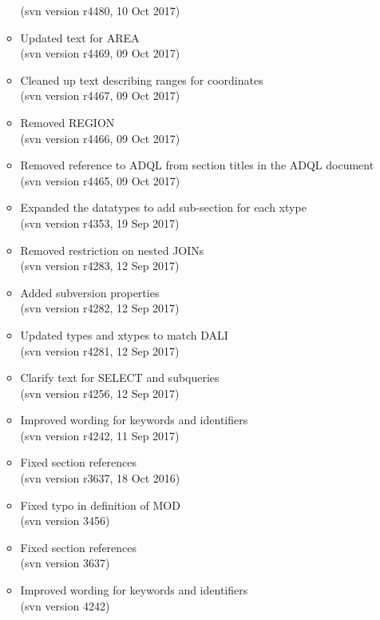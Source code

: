 \documentclass[11pt,a4paper]{ivoa}
\begin{document}
\begin{itemize}
\begin{itemize}
            (svn version r4480, 10 Oct 2017)
            \item Updated text for AREA\\
            (svn version r4469, 09 Oct 2017)
            \item Cleaned up text describing ranges for coordinates\\
            (svn version r4467, 09 Oct 2017)
            \item Removed REGION\\
            (svn version r4466, 09 Oct 2017)
            \item Removed reference to ADQL from section titles in the ADQL document\\
            (svn version r4465, 09 Oct 2017)
            \item Expanded the datatypes to add sub-section for each xtype\\
            (svn version r4353, 19 Sep 2017)
            \item Removed restriction on nested JOINs\\
            (svn version r4283, 12 Sep 2017)
            \item Added subversion properties\\
            (svn version r4282, 12 Sep 2017)
            \item Updated types and xtypes to match DALI\\
            (svn version r4281, 12 Sep 2017)
            \item Clarify text for SELECT and subqueries\\
            (svn version r4256, 12 Sep 2017)
            \item Improved wording for keywords and identifiers\\
            (svn version r4242, 11 Sep 2017)
            \item Fixed section references\\
            (svn version r3637, 18 Oct 2016)
            \item Fixed typo in definition of MOD\\
            (svn version 3456)
            \item Fixed section references\\
            (svn version 3637)
            \item Improved wording for keywords and identifiers\\
            (svn version 4242)
        \end{itemize}


\end{itemize}
\end{document}
